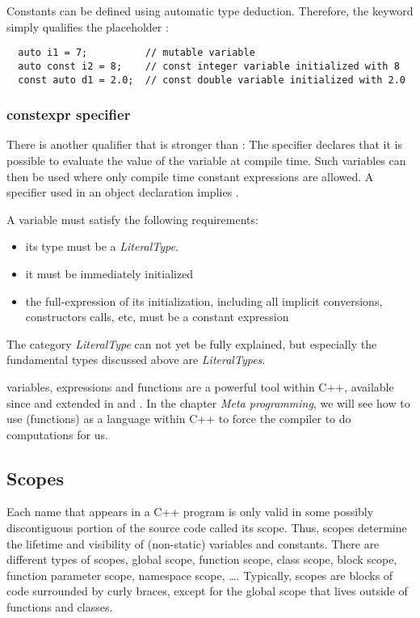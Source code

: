 Constants can be defined using automatic type deduction. Therefore, the keyword  simply qualifies the placeholder :
%
\begin{verbatim}
  auto i1 = 7;          // mutable variable
  auto const i2 = 8;    // const integer variable initialized with 8
  const auto d1 = 2.0;  // const double variable initialized with 2.0
\end{verbatim}

\subsubsection{constexpr specifier}
There is another qualifier that is stronger than : The  specifier declares that it is possible to evaluate the
value of the variable at compile time. Such variables can then be used where only compile time constant expressions are allowed.
A  specifier used in an object declaration implies .

A  variable must satisfy the following requirements:
\begin{itemize}
  \item its type must be a \emph{LiteralType}.
  \item it must be immediately initialized
  \item the full-expression of its initialization, including all implicit conversions, constructors calls, etc, must be a constant expression
\end{itemize}

The category \emph{LiteralType} can not yet be fully explained, but especially the fundamental types discussed above are \emph{LiteralTypes}.

\begin{rem}
   variables, expressions and functions are a powerful tool within C++, available since  and extended in  and .
  In the chapter \emph{Meta programming}, we will see how to use  (functions) as a language within C++ to force the compiler to
  do computations for us.
\end{rem}


\subsection{Scopes}
Each name that appears in a C++ program is only valid in some possibly discontiguous portion of the source code called its scope. Thus,
scopes determine the lifetime and visibility of (non-static) variables and constants. There are different types of scopes,
global scope, function scope, class scope, block scope, function parameter scope, namespace scope, \dots. Typically, scopes are blocks of
code surrounded by curly braces, except for the global scope that lives outside of functions and classes.

